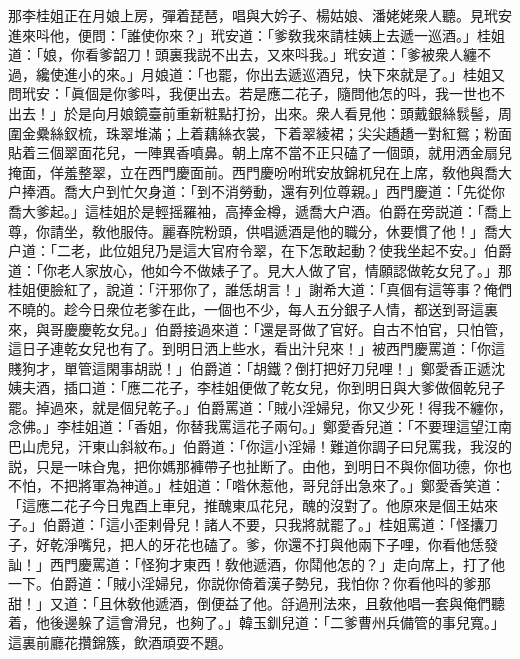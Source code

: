 那李桂姐正在月娘上房，彈着琵琶，唱與大妗子、楊姑娘、潘姥姥衆人聽。見玳安進來呌他，便問：「誰使你來？」玳安道：「爹敎我來請桂姨上去遞一巡酒。」桂姐道：「娘，你看爹韶刀！頭裏我説不出去，又來呌我。」玳安道：「爹被衆人纏不過，纔使進小的來。」月娘道：「也罷，你出去遞巡酒兒，快下來就是了。」桂姐又問玳安：「眞個是你爹呌，我便出去。若是應二花子，隨問他怎的呌，我一世也不出去！」於是向月娘鏡臺前重新粧點打扮，出來。衆人看見他：頭戴銀絲䯼髻，周圍金纍絲釵梳，珠翠堆滿；上着藕絲衣裳，下着翠綾裙；尖尖趫趫一對紅鴛；粉面貼着三個翠面花兒，一陣異香噴鼻。朝上席不當不正只磕了一個頭，就用洒金扇兒掩面，佯羞整翠，立在西門慶面前。西門慶吩咐玳安放錦杌兒在上席，敎他與喬大户捧酒。喬大户到忙欠身道：「到不消勞動，還有列位尊親。」西門慶道：「先從你喬大爹起。」這桂姐於是輕摇羅袖，高捧金樽，遞喬大户酒。伯爵在旁説道：「喬上尊，你請坐，敎他服侍。麗春院粉頭，供唱遞酒是他的職分，休要慣了他！」喬大户道：「二老，此位姐兒乃是這大官府令翠，在下怎敢起動？使我坐起不安。」伯爵道：「你老人家放心，他如今不做婊子了。見大人做了官，情願認做乾女兒了。」那桂姐便臉紅了，說道：「汗邪你了，誰恁胡言！」謝希大道：「真個有這等事？俺們不曉的。趁今日衆位老爹在此，一個也不少，每人五分銀子人情，都送到哥這裏來，與哥慶慶乾女兒。」伯爵接過來道：「還是哥做了官好。自古不怕官，只怕管，這日子連乾女兒也有了。到明日洒上些水，看出汁兒來！」被西門慶罵道：「你這賤狗才，單管這閑事胡説！」伯爵道：「胡鐵？倒打把好刀兒哩！」鄭愛香正遞沈姨夫酒，插口道：「應二花子，李桂姐便做了乾女兒，你到明日與大爹做個乾兒子罷。掉過來，就是個兒乾子。」伯爵罵道：「賊小淫婦兒，你又少死！得我不纏你，念佛。」李桂姐道：「香姐，你替我罵這花子兩句。」鄭愛香兒道：「不要理這望江南巴山虎兒，汗東山斜紋布。」伯爵道：「你這小淫婦！難道你調子曰兒罵我，我沒的説，只是一味㒲鬼，把你媽那褲帶子也扯断了。由他，到明日不與你個功德，你也不怕，不把將軍為神道。」桂姐道：「喒休惹他，哥兒㧱出急來了。」鄭愛香笑道：「這應二花子今日鬼酉上車兒，推醜東瓜花兒，醜的沒對了。他原來是個王姑來子。」伯爵道：「這小歪剌骨兒！諸人不要，只我將就罷了。」桂姐罵道：「怪攮刀子，好乾淨嘴兒，把人的牙花也磕了。爹，你還不打與他兩下子哩，你看他恁發訕！」西門慶罵道：「怪狗才東西！敎他遞酒，你鬦他怎的？」走向席上，打了他一下。伯爵道：「賊小淫婦兒，你説你倚着漢子勢兒，我怕你？你看他呌的爹那甜！」又道：「且休敎他遞酒，倒便益了他。㧱過刑法來，且敎他唱一套與俺們聽着，他後邊躲了這會滑兒，也夠了。」韓玉釧兒道：「二爹曹州兵備管的事兒寬。」這裏前廳花攢錦簇，飲酒頑耍不題。


